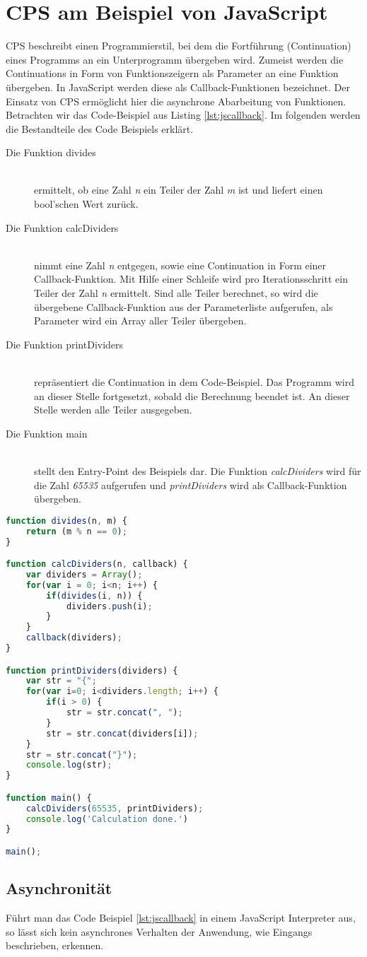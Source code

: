 \section{\acl{CPS} am Beispiel von JavaScript}
\label{sec:jscps}\acl{CPS} beschreibt einen Programmierstil, bei dem die Fortführung (Continuation) eines Programms an ein Unterprogramm übergeben wird. Zumeist werden die Continuations in Form von Funktionszeigern als Parameter an eine Funktion übergeben. In JavaScript werden diese als Callback-Funktionen bezeichnet. Der Einsatz von \acs{CPS} ermöglicht hier die asynchrone Abarbeitung von Funktionen. Betrachten wir das Code-Beispiel aus Listing \ref{lst:jscallback}. Im folgenden werden die Bestandteile des Code Beispiels erklärt.
\begin{description}
\item[Die Funktion divides]\hfill \\
ermittelt, ob eine Zahl \textit{n} ein Teiler der Zahl \textit{m} ist und liefert einen bool'schen Wert zurück.
\item[Die Funktion calcDividers]\hfill \\
nimmt eine Zahl \textit{n} entgegen, sowie eine Continuation in Form einer Callback-Funktion. Mit Hilfe einer Schleife wird pro Iterationsschritt ein Teiler der Zahl \textit{n} ermittelt. Sind alle Teiler berechnet, so wird die übergebene Callback-Funktion aus der Parameterliste aufgerufen, als Parameter wird ein Array aller Teiler übergeben.
\item[Die Funktion printDividers] \hfill \\
repräsentiert die Continuation in dem Code-Beispiel. Das Programm wird an dieser Stelle fortgesetzt, sobald die Berechnung beendet ist. An dieser Stelle werden alle Teiler ausgegeben.
\item[Die Funktion main]\hfill \\
stellt den Entry-Point des Beispiels dar. Die Funktion \textit{calcDividers} wird für die Zahl \textit{65535} aufgerufen und \textit{printDividers} wird als Callback-Funktion übergeben.\\
\end{description}
\begin{lstlisting}[language=JavaScript,caption=JavaScript Callback Beispiel,label=lst:jscallback]
function divides(n, m) {
	return (m % n == 0);
}

function calcDividers(n, callback) {
	var dividers = Array();
	for(var i = 0; i<n; i++) {
		if(divides(i, n)) {
			dividers.push(i);
		}
	}
	callback(dividers);	
}

function printDividers(dividers) {
	var str = "{";
	for(var i=0; i<dividers.length; i++) {
		if(i > 0) {
			str = str.concat(", ");
		}
		str = str.concat(dividers[i]);
	}
	str = str.concat("}");
	console.log(str);
}

function main() {
	calcDividers(65535, printDividers);
	console.log('Calculation done.')
}

main();
\end{lstlisting}
\subsection*{Asynchronität}
Führt man das Code Beispiel \ref{lst:jscallback} in einem JavaScript Interpreter aus, so lässt sich kein asynchrones Verhalten der Anwendung, wie Eingangs beschrieben, erkennen. 
\acresetall
